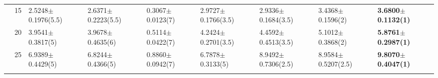 \begin{table*}[]
\begin{adjustbox}{width=1.0\textwidth,center}
\begin{tabular}{lllllllll}
      & 15                             & 2.5248$\pm$0.1976(5.5)       & 2.6371$\pm$0.2223(5.5)        & 0.3067$\pm$0.0123(7)              & 2.9727$\pm$0.1766(3.5)                            & 2.9336$\pm$0.1684(3.5)                   & 3.4368$\pm$0.1596(2)                       & \textbf{3.6800$\pm$0.1132(1)}   \\
      & 20                             & 3.9541$\pm$0.3817(5)         & 3.9678$\pm$0.4635(6)          & 0.5114$\pm$0.0422(7)              & 4.2424$\pm$0.2701(3.5)                            & 4.4592$\pm$0.4513(3.5)                   & 5.1012$\pm$0.3868(2)                       & \textbf{5.8761$\pm$0.2987(1)}   \\
      & 25                             & 6.9389$\pm$0.4429(5)         & 6.8244$\pm$0.4366(5)          & 0.8860$\pm$0.0942(7)              & 6.7878$\pm$0.3133(5)                              & 8.9492$\pm$0.7306(2.5)                   & 8.9584$\pm$0.5207(2.5)                     & \textbf{9.8070$\pm$0.4047(1)}  \\\thickhline
\end{tabular}
\end{adjustbox}
\end{table*}